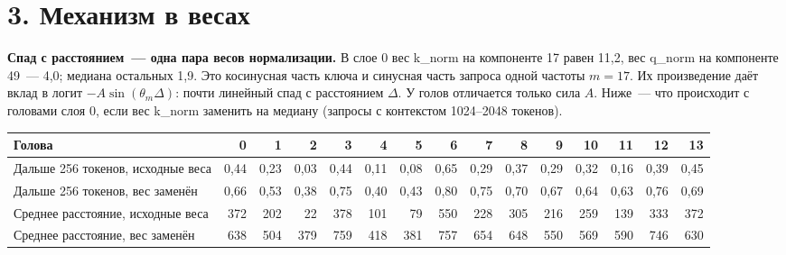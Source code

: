 \documentclass[10pt]{article}
\begin{document}
\section*{3. Механизм в весах}
\noindent\begin{minipage}{\linewidth}
\textbf{Спад с расстоянием~— одна пара весов нормализации.} В слое 0 вес k\_norm на компоненте 17 равен 11,2, вес q\_norm на компоненте 49~— 4,0; медиана остальных 1,9. Это косинусная часть ключа и синусная часть запроса одной частоты $m{=}17$. Их произведение даёт вклад в логит $-A\sin(\theta_m\Delta)$: почти линейный спад с расстоянием $\Delta$. У голов отличается только сила $A$. Ниже~— что происходит с головами слоя 0, если вес k\_norm заменить на медиану (запросы с контекстом 1024–2048 токенов).
\begin{center}\begin{tabular}{|l|r|r|r|r|r|r|r|r|r|r|r|r|r|r|}\hline \rowcolor{head}\textbf{Голова} & \textbf{0} & \textbf{1} & \textbf{2} & \textbf{3} & \textbf{4} & \textbf{5} & \textbf{6} & \textbf{7} & \textbf{8} & \textbf{9} & \textbf{10} & \textbf{11} & \textbf{12} & \textbf{13} \\ \hline
Дальше 256 токенов, исходные веса & 0,44 & 0,23 & 0,03 & 0,44 & 0,11 & 0,08 & 0,65 & 0,29 & 0,37 & 0,29 & 0,32 & 0,16 & 0,39 & 0,45 \\ \hline
Дальше 256 токенов, вес заменён & 0,66 & 0,53 & 0,38 & 0,75 & 0,40 & 0,43 & 0,80 & 0,75 & 0,70 & 0,67 & 0,64 & 0,63 & 0,76 & 0,69 \\ \hline
Среднее расстояние, исходные веса & 372 & 202 & 22 & 378 & 101 & 79 & 550 & 228 & 305 & 216 & 259 & 139 & 333 & 372 \\ \hline
Среднее расстояние, вес заменён & 638 & 504 & 379 & 759 & 418 & 381 & 757 & 654 & 648 & 550 & 569 & 590 & 746 & 630 \\ \hline\end{tabular}\end{center}
\end{minipage}
\par
\end{document}
